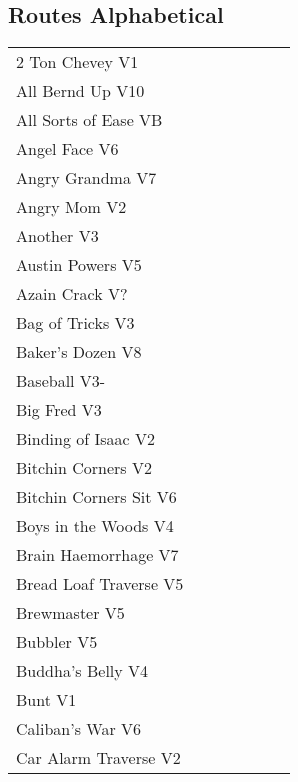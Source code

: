 \twocolumn
{}
\begin{flushleft}
\section{Routes Alphabetical}
\begin{center}
\begin{supertabular}{p{0.65\linewidth}r}
2 Ton Chevey V1 & \pageref{rt:2 Ton Chevey} \\
All Bernd Up V10 & \pageref{rt:All Bernd Up} \\
All Sorts of Ease VB & \pageref{rt:All Sorts of Ease} \\
Angel Face V6 & \pageref{rt:Angel Face} \\
Angry Grandma V7 & \pageref{rt:Angry Grandma} \\
Angry Mom V2 & \pageref{rt:Angry Mom} \\
Another V3 & \pageref{rt:Another} \\
Austin Powers V5 & \pageref{rt:Austin Powers} \\
Azain Crack V? & \pageref{rt:Azain Crack} \\
Bag of Tricks V3 & \pageref{vr:Bag of Tricks} \\
Baker's Dozen V8 & \pageref{vr:Baker's Dozen} \\
Baseball V3- & \pageref{rt:Baseball} \\
Big Fred V3 & \pageref{rt:Big Fred} \\
Binding of Isaac V2 & \pageref{rt:Binding of Isaac} \\
Bitchin Corners V2 & \pageref{rt:Bitchin Corners} \\
Bitchin Corners Sit V6 & \pageref{vr:Bitchin Corners Sit} \\
Boys in the Woods V4 & \pageref{rt:Boys in the Woods} \\
Brain Haemorrhage V7 & \pageref{vr:Brain Haemorrhage} \\
Bread Loaf Traverse V5 & \pageref{rt:Bread Loaf Traverse} \\
Brewmaster V5 & \pageref{rt:Brewmaster} \\
Bubbler V5 & \pageref{rt:Bubbler} \\
Buddha's Belly V4 & \pageref{rt:Buddha's Belly} \\
Bunt V1 & \pageref{rt:Bunt} \\
Caliban's War V6 & \pageref{rt:Caliban's War} \\
Car Alarm Traverse V2 & \pageref{rt:Car Alarm Traverse} \\

\end{supertabular}
\end{center}
\end{flushleft}
